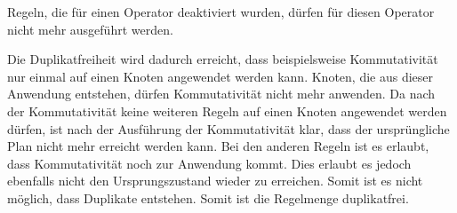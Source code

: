 Regeln, die für einen Operator deaktiviert wurden, dürfen für diesen Operator nicht mehr ausgeführt werden.


Die Duplikatfreiheit wird dadurch erreicht, dass beispielsweise Kommutativität nur einmal auf einen Knoten angewendet werden kann. Knoten, die aus dieser Anwendung entstehen, dürfen Kommutativität nicht mehr anwenden. Da nach der Kommutativität keine weiteren Regeln auf einen Knoten angewendet werden dürfen, ist nach der Ausführung der Kommutativität klar, dass der ursprüngliche Plan nicht mehr erreicht werden kann. Bei den anderen Regeln ist es erlaubt, dass Kommutativität noch zur Anwendung kommt. Dies erlaubt es jedoch ebenfalls nicht den Ursprungszustand wieder zu erreichen. Somit ist es nicht möglich, dass Duplikate entstehen. Somit ist die Regelmenge duplikatfrei.



